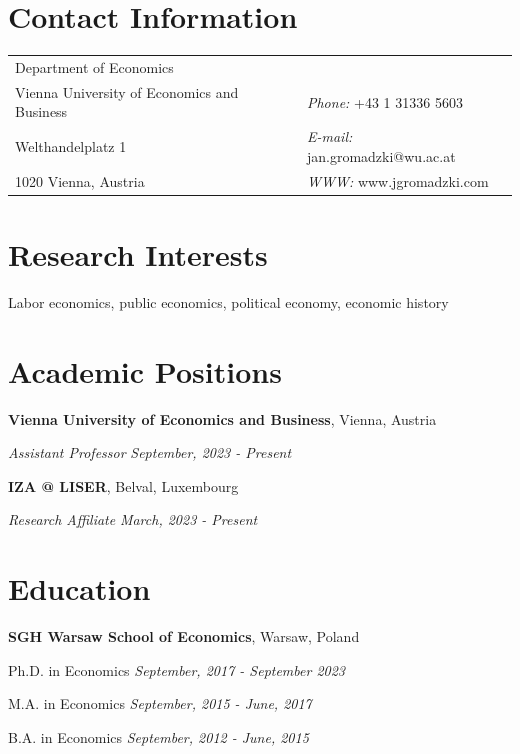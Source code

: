 \documentclass[margin,line]{res}
\newenvironment{list1}{
  \begin{list}{\ding{113}}{%
      \setlength{\itemsep}{0in}
      \setlength{\parsep}{0in} \setlength{\parskip}{0in}
      \setlength{\topsep}{0in} \setlength{\partopsep}{0in} 
      \setlength{\leftmargin}{0.17in}}}{\end{list}}
\begin{document}

\begin{resume}
\section{\sc Contact Information}
\vspace{.05in}
\begin{tabular}{@{}p{3.85in}p{4in}}            
Department of Economics   \\         
Vienna University of Economics and Business & {\it Phone:}  +43 1 31336 5603\\ 
Welthandelplatz 1 & {\it E-mail:}  jan.gromadzki@wu.ac.at\\       
1020 Vienna, Austria  & {\it WWW:} www.jgromadzki.com \\     
\end{tabular}


\section{\sc Research Interests}
Labor economics, public economics, political economy, economic history
\vspace*{.075in}

\section{\sc Academic Positions}
{\bf Vienna University of Economics and Business}, Vienna, Austria

\vspace{-.3cm}
{\em Assistant Professor} \hfill \textit{September, 2023 - Present}
\vspace*{.05in} 

{\bf IZA @ LISER}, Belval, Luxembourg 

\vspace{-.3cm}
{\em Research Affiliate} \hfill \textit{March, 2023 - Present}
\vspace*{.05in} 

\section{\sc Education}
{\bf SGH Warsaw School of Economics}, Warsaw, Poland\\
\vspace*{-.1in}
\begin{list1}
\item[] Ph.D. in Economics \textit{\hfill September, 2017 - September 2023}
\vspace*{.05in}
\item[] M.A. in Economics \hfill \textit{September, 2015 - June, 2017}
\vspace*{.05in}
\item[] B.A. in Economics \hfill \textit{September, 2012 - June, 2015}
\end{list1}


\end{resume}
\end{document}
